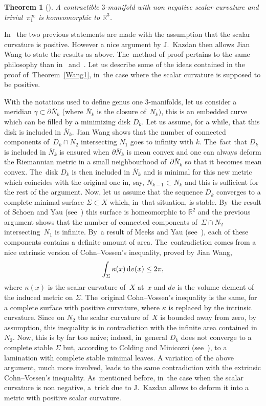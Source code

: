 \documentclass[pdftex]{sigma}
\numberwithin{equation}{section}
\newtheorem{theor}{Theorem}[section]
\begin{document}
\begin{theor}[\cite{Wang2}]\label{Wang2}
A contractible $3$-manifold with non negative scalar curvature and trivial~$\pi_1^{\infty}$ is homeomorphic to $\mathbb{R}^{3}$.
\end{theor}

In~\cite{Wang1, Wang2} the two previous statements are made with the assumption that the scalar curvature is positive. However a nice argument by J.~Kazdan then allows Jian Wang to state the results as above. The~method
of proof pertains to the same philosophy than in~\cite{SchoenYau:stable} and~\cite{GromovLawson}. Let us describe some of the ideas contained in the proof of~Theorem~\ref{Wang1}, in~the case where the scalar curvature is supposed to be positive.

 With the notations used to define genus one $3$-manifolds, let us consider a meridian $\gamma\subset\partial {\bar N}_k$ (where $\bar N_k$ is the
closure of~$N_k)$, this is an embedded curve which can be filled by a minimizing disk $D_k$. Let us assume, for a while, that this disk is included in $\bar N_k$. Jian Wang shows that the number of connected components of~$D_k\cap N_2$ intersecting $N_1$ goes to infinity with $k$. The~fact that $D_k$ is included in $\bar N_k$ is ensured when $\partial \bar N_k$ is mean convex and one can always deform the Riemannian metric in a small neighbourhood of~$\partial \bar N_k$ so that it becomes mean convex. The~disk $D_k$ is then included in $\bar N_k$ and is minimal for this new metric which coincides with the original one in, say, $N_{k-1}\subset N_k$ and this is sufficient for the rest of the argument. Now, let us assume that the sequence $D_k$ converges to a complete minimal surface $\Sigma\subset X$ which, in~that situation, is stable. By~the result of Schoen and Yau (see~\cite{SchoenYau:stable}) this surface is homeomorphic to $\mathbb{R}^2$ and the previous argument shows that the number of connected components of~$\Sigma\cap N_2$ intersecting~$N_1$ is infinite. By~a result of Meeks and Yau (see~\cite{Mee-Yau}), each of these components contains a definite amount of area. The~contradiction comes from a nice extrinsic version of Cohn--Vossen's inequality, proved by Jian Wang,
\[
\int_\Sigma \kappa (x)\,{\rm d} v(x) \leq 2\pi,
\]
where $\kappa (x)$ is the scalar curvature of~$X$ at~$x$ and $dv$ is the volume element of the induced metric on $\Sigma$. The~original Cohn--Vossen's inequality is the same, for a complete surface with positive curvature, where $\kappa$ is replaced by the intrinsic curvature. Since on $N_2$ the scalar curvature of~$X$ is bounded away from zero, by assumption, this inequality is in contradiction with the infinite area contained in~$N_2$. Now, this is by far too naive; indeed, in~general $D_k$ does not converge to a complete stable $\Sigma$ but, according to Colding and Minicozzi
(see~\cite{Col-Min}), to a lamination with complete stable minimal leaves. A variation of the above argument, much more involved, leads to the same contradiction with the extrinsic Cohn--Vossen's inequality. As~mentioned before, in~the case when the scalar curvature is non negative, a~trick
due to J.~Kazdan allows to deform it into a metric with positive scalar curvature.
\end{document}

